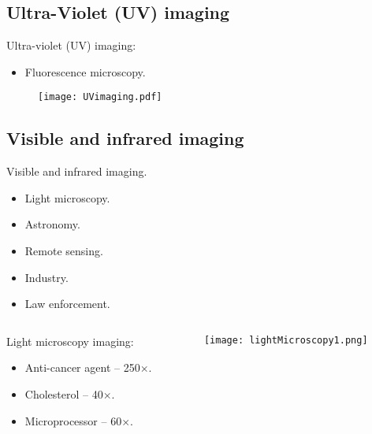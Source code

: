 
\subsection*{Ultra-Violet (UV) imaging}


\begin{frame}
Ultra-violet (UV) imaging:
\begin{itemize}
\item Fluorescence microscopy.
\end{itemize}
\begin{figure}
\texttt{[image: UVimaging.pdf]}
\end{figure}
\end{frame}


\subsection*{Visible and infrared imaging}


\begin{frame}
Visible and infrared imaging.
\begin{itemize}
\item Light microscopy.
\item Astronomy.
\item Remote sensing.
\item Industry.
\item Law enforcement.
\end{itemize}
\end{frame}


\begin{frame}
\begin{columns}
\begin{column}{.48\textwidth}
Light microscopy imaging:
\begin{itemize}
\item Anti-cancer agent -- 250$\times$.
\item Cholesterol -- 40$\times$.
\item Microprocessor -- 60$\times$.
\end{itemize}
\end{column}
\begin{column}{.48\textwidth}
\begin{figure}
\texttt{[image: lightMicroscopy1.png]}
\end{figure}
\end{column}
\end{columns}
\end{frame}

